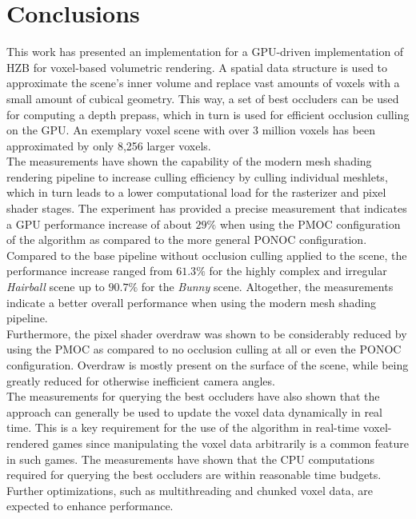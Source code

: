 \chapter{Conclusions} \label{cpt-conclusion}


This work has presented an implementation for a \ac{GPU}-driven implementation of 
\ac{HZB} for voxel-based volumetric rendering. A spatial data structure is 
used to approximate the scene's inner volume and replace vast amounts of voxels 
with a small amount of cubical geometry. This way, a set of best occluders can 
be used for computing a depth prepass, which in turn is used for efficient 
occlusion culling on the \ac{GPU}. An exemplary voxel scene with over 3 million 
voxels has been approximated by only 8,256 larger voxels.  \\


\noindent
The measurements have shown the capability of the modern mesh shading rendering 
pipeline to increase culling efficiency by culling individual meshlets, which in 
turn leads to a lower computational load for the rasterizer and pixel shader 
stages. The experiment has provided a precise measurement that indicates a \ac{GPU} 
performance increase of about $29 \%$ when using the \ac{PMOC} configuration 
of the algorithm as compared to the more general \ac{PONOC} configuration. 
Compared to the base pipeline without occlusion culling applied to the scene, the 
performance increase ranged from $61.3 \%$ for the highly complex and irregular 
\emph{Hairball} scene up to $90.7 \%$ for the \emph{Bunny} scene. Altogether, the 
measurements indicate a better overall performance when using the modern mesh shading 
pipeline.\\

\noindent
Furthermore, the pixel shader overdraw was shown to be considerably reduced by using 
the \ac{PMOC} as compared to no occlusion culling at all or even the \ac{PONOC} 
configuration. Overdraw is mostly present on the surface of the scene, while being 
greatly reduced for otherwise inefficient camera angles. \\

\noindent
The measurements for querying the best occluders have also shown that the approach can 
generally be used to update the voxel data dynamically in real time. This is a key 
requirement for the use of the algorithm in real-time voxel-rendered games since 
manipulating the voxel data arbitrarily is a common feature in such games. The 
measurements have shown that the \ac{CPU} computations required for querying the 
best occluders are within reasonable time budgets. Further optimizations, such as 
multithreading and chunked voxel data, are expected to enhance performance. \\

